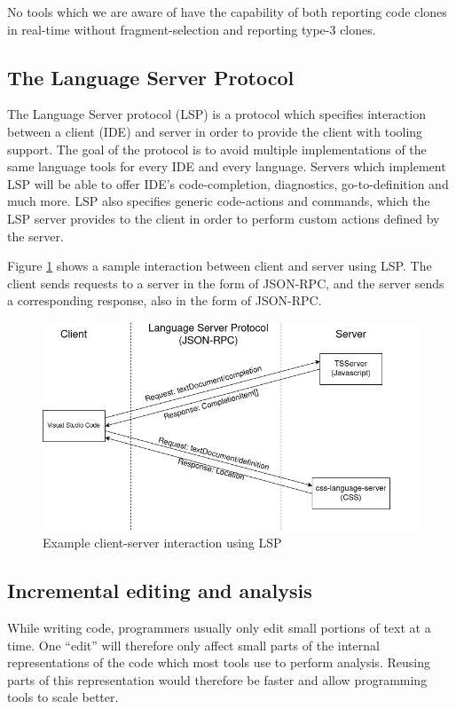 \documentclass[12pt]{article}
\begin{document}
No tools which we are aware of have the capability of both reporting code clones in
real-time without fragment-selection and reporting type-3 clones. 

\subsection{The Language Server Protocol}

The Language Server protocol (LSP) is a protocol which specifies interaction between a
client (IDE) and server in order to provide the client with tooling support. The goal of
the protocol is to avoid multiple implementations of the same language tools for every
IDE and every language. Servers which implement LSP will be able to offer IDE's
code-completion, diagnostics, go-to-definition and much more. LSP also specifies generic
code-actions and commands, which the LSP server provides to the client in order to perform
custom actions defined by the server.

Figure \ref{fig:lspcommunication} shows a sample interaction between client and server
using LSP. The client sends requests to a server in the form of JSON-RPC, and the server
sends a corresponding response, also in the form of JSON-RPC.

\begin{figure}
	\includegraphics[width=\textwidth]{images/lspcommunication.png}
	\caption{Example client-server interaction using LSP}
	\label{fig:lspcommunication}
\end{figure}

\subsection{Incremental editing and analysis}

While writing code, programmers usually only edit small portions of text at a time. One
``edit'' will therefore only affect small parts of the internal representations of the
code which most tools use to perform analysis. Reusing parts of this representation would
therefore be faster and allow programming tools to scale better.
\end{document}
